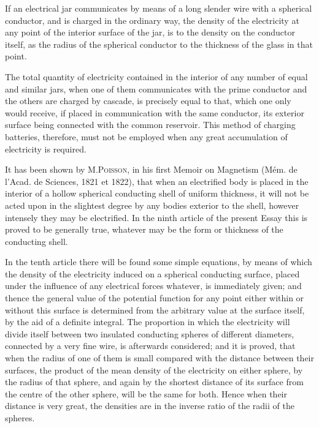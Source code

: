 \documentclass[11pt,notitlepage]{amsart}
\let\Person\textsc
\begin{document}
If an electrical jar communicates by means of a long slender wire
with a spherical conductor, and is charged in the ordinary way, the density
of the electricity at any point of the interior surface of the jar, is to the
density on the conductor itself, as the radius of the spherical conductor to the
thickness of the glass in that point.

The total quantity of electricity contained in the interior of any number
of equal and similar jars, when one of them communicates with the prime
conductor and the others are charged by cascade, is precisely equal to that,
which one only would receive, if placed in communication with the same
conductor, its exterior surface being connected with the common reservoir.
This method of charging batteries, therefore, must not be employed when any
great accumulation of electricity is required.

It has been shown by M.\Person{Poisson}, in his first Memoir on Magnetism
(M\'em. de l'Acad. de Sciences, 1821 et 1822), that when an electrified body
is placed in the interior of a hollow spherical conducting shell of uniform
thickness, it will not be acted upon in the slightest degree by any bodies
exterior to the shell, however intensely they may be electrified. In the ninth
article of the present Essay this is proved to be generally true, whatever may
be the form or thickness of the conducting shell.

In the tenth article there will be found some simple equations, by
means of which the density of the electricity induced on a spherical conducting
surface, placed under the influence of any electrical forces whatever, is 
immediately given; and thence the general value of the potential function for
any point either within or without this surface is determined from the arbitrary
value at the surface itself, by the aid of a definite integral. The proportion
in which the electricity will divide itself between two insulated conducting
spheres of different diameters, connected by a very fine wire, is afterwards
considered; and it is proved, that when the radius of one of them is small
compared with the distance between their surfaces, the product of the mean
density of the electricity on either sphere, by the radius of that sphere, and
again by the shortest distance of its surface
from the centre of the other sphere,
will be the same for both. Hence when their distance is very great, the
densities are in the inverse ratio of the radii of the spheres.
\end{document}
